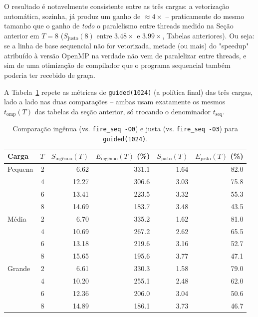 \documentclass[12pt,a4paper]{article}
\begin{document}
O resultado é notavelmente consistente entre as três cargas: a
vetorização automática, sozinha, já produz um ganho de
$\approx\!4\times$ -- praticamente do mesmo tamanho que o ganho de
\emph{todo} o paralelismo entre threads medido na Seção anterior em
$T=8$ ($S_{\text{justo}}(8)$ entre $3.48\times$ e $3.99\times$, Tabelas
anteriores). Ou seja: se a linha de base sequencial não for vetorizada,
metade (ou mais) do "speedup" atribuído à versão OpenMP na verdade não
vem de paralelizar entre threads, e sim de uma otimização de compilador
que o programa sequencial também poderia ter recebido de graça.

A Tabela~\ref{tab:simd-ingenuo-justo} repete as métricas de
\texttt{guided(1024)} (a política final) das três cargas, lado a lado
nas duas comparações -- ambas usam exatamente os mesmos
$t_{\mathrm{omp}}(T)$ das tabelas da seção anterior, só trocando o
denominador $t_{\mathrm{seq}}$.

\begin{table}[H]
\centering\small
\caption{Comparação ingênua (vs. \texttt{fire\_seq -O0}) e justa (vs. \texttt{fire\_seq -O3}) para \texttt{guided(1024)}.}
\label{tab:simd-ingenuo-justo}
\begin{tabular}{lrrrrr}
\toprule
\textbf{Carga} & $T$ & $S_{\text{ingênuo}}(T)$ & $E_{\text{ingênuo}}(T)$ (\%) & $S_{\text{justo}}(T)$ & $E_{\text{justo}}(T)$ (\%) \\
\midrule
Pequena & 2 & 6.62 & 331.1 & 1.64 & 82.0 \\
        & 4 & 12.27 & 306.6 & 3.03 & 75.8 \\
        & 6 & 13.41 & 223.5 & 3.32 & 55.3 \\
        & 8 & 14.69 & 183.7 & 3.48 & 43.5 \\
\midrule
Média   & 2 & 6.70 & 335.2 & 1.62 & 81.0 \\
        & 4 & 10.69 & 267.2 & 2.62 & 65.5 \\
        & 6 & 13.18 & 219.6 & 3.16 & 52.7 \\
        & 8 & 15.65 & 195.6 & 3.77 & 47.1 \\
\midrule
Grande  & 2 & 6.61 & 330.3 & 1.58 & 79.0 \\
        & 4 & 10.20 & 255.1 & 2.48 & 62.0 \\
        & 6 & 12.36 & 206.0 & 3.04 & 50.6 \\
        & 8 & 14.89 & 186.1 & 3.73 & 46.7 \\
\bottomrule
\end{tabular}
\end{table}
\end{document}
